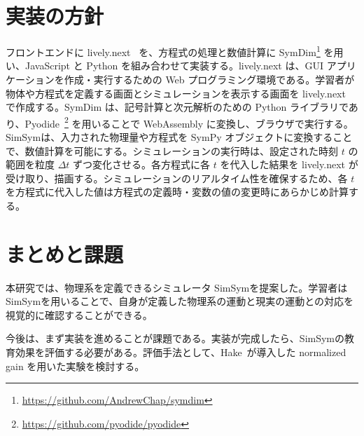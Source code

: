 \documentclass[11pt, a4paper, oneside, twocolumn, dvipdfmx]{jsarticle}
\newcommand{\simname}{SimSym}
\begin{document}
\section{実装の方針} \label{sec3}
フロントエンドに lively.next~\cite{ingalls_2008} を、方程式の処理と数値計算に
SymDim\footnote{\url{https://github.com/AndrewChap/symdim}}
を用い、JavaScript と Python を組み合わせて実装する。lively.next は、GUI アプリケーションを作成・実行するための Web プログラミング環境である。学習者が物体や方程式を定義する画面とシミュレーションを表示する画面を lively.next で作成する。SymDim は、記号計算と次元解析のための Python ライブラリであり、Pyodide~\footnote{\url{https://github.com/pyodide/pyodide}} を用いることで WebAssembly に変換し、ブラウザで実行する。\simname は、入力された物理量や方程式を SymPy オブジェクトに変換することで、数値計算を可能にする。シミュレーションの実行時は、設定された時刻 $t$ の範囲を粒度 $\Delta t$ ずつ変化させる。各方程式に各 $t$ を代入した結果を lively.next が受け取り、描画する。シミュレーションのリアルタイム性を確保するため、各 $t$ を方程式に代入した値は方程式の定義時・変数の値の変更時にあらかじめ計算する。

\section{まとめと課題}
本研究では、物理系を定義できるシミュレータ \simname を提案した。学習者は\simname を用いることで、自身が定義した物理系の運動と現実の運動との対応を視覚的に確認することができる。

今後は、まず実装を進めることが課題である。実装が完成したら、\simname の教育効果を評価する必要がある。評価手法として、Hake~\cite{hake_1998}が導入した normalized gain を用いた実験を検討する。


\renewcommand{\refname}{}
\vspace{-5mm}
\tiny{}
\end{document}
